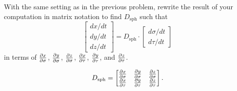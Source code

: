 \documentclass[newpage,hints,handout,noauthor,nooutcomes,12pt]{ximera}
\begin{document}
\begin{problem}
  With the same setting as in the previous problem, rewrite the result
  of your computation in matrix notation to find $D_{\mathrm{sph}}$ such
  that
\[
\begin{bmatrix}
dx/dt\\ dy/dt \\ dz/dt
\end{bmatrix}
= D_{\mathrm{sph}} \cdot
\begin{bmatrix}
d\sigma/dt \\ d\tau/dt
\end{bmatrix}
\]
in terms of $\pp[x]{\sigma}$, $\pp[y]{\sigma}$, $\pp[z]{\sigma}$,
$\pp[x]{\tau}$, $\pp[y]{\tau}$, and $\pp[z]{\tau}$.
\begin{freeResponse}
  \[
  D_{\mathrm{sph}} =
  \begin{bmatrix}
    \pp[x]{\sigma} & \pp[y]{\sigma} & \pp[z]{\sigma} \\
    \pp[x]{\tau}   & \pp[y]{\tau}   & \pp[z]{\tau}
  \end{bmatrix}.
  \]
\end{freeResponse}
\end{problem}
\end{document}
